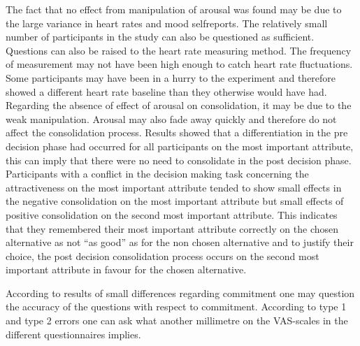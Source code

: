 \documentclass[jou,draftfirst,11pt]{apa6}
\begin{document}
The fact that no effect from manipulation of arousal was found may be
due to the large variance in heart rates and mood selfreports.  The
relatively small number of participants in the study can also be
questioned as sufficient.  Questions can also be raised to the heart
rate measuring  method.   The frequency of measurement may not have
been high enough to catch heart rate fluctuations.  Some participants
may have been in a hurry to the experiment and therefore showed a
different heart rate baseline than they otherwise would have had.
Regarding the absence of effect of arousal on consolidation, it may be
due to the weak manipulation.  Arousal may also fade away quickly and
therefore do not affect the consolidation process.  Results showed
that a differentiation in the pre decision phase had occurred for all
participants on the most important attribute, this can imply that
there were no need to consolidate in the post decision phase.
Participants with a conflict in the decision making task concerning
the attractiveness on the most important attribute tended to show
small effects in the negative consolidation on the most important
attribute but small effects of positive consolidation on the second
most important attribute. This indicates that they remembered their
most important attribute correctly on the chosen alternative as not
``as good'' as for the non chosen alternative and to justify their
choice, the post decision consolidation process occurs on the second
most important attribute in favour for the chosen alternative.

According to results of small differences regarding commitment  one
may question the accuracy of the questions with respect to
commitment.  According to type 1 and type 2 errors one can ask what
another millimetre on the VAS-scales in the different questionnaires
implies.
\end{document}
